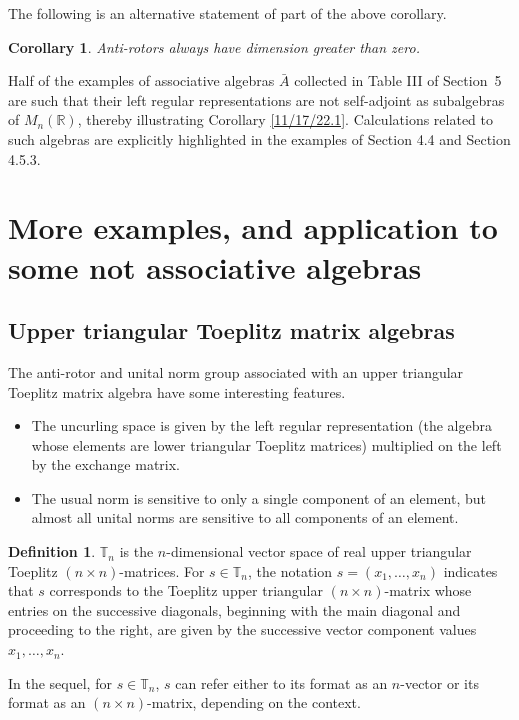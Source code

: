 \documentclass{amsart}
\numberwithin{equation}{section}
\newtheorem{corollary}[theorem]{Corollary}
\theoremstyle{definition}
\newtheorem{definition}[theorem]{Definition}
\numberwithin{theorem}{section}
\begin{document}
 The following is an alternative statement of part of the above corollary.   
 
 \begin{corollary}\label{1/1/23.1} Anti-rotors always have dimension greater than zero. \end{corollary}


Half of the examples of associative algebras $\bar{A}$ collected in Table III of \mbox{Section 5} are such that their left regular representations are not self-adjoint as subalgebras of $M_n(\mathbb{R})$, thereby illustrating Corollary \ref{11/17/22.1}.  Calculations related to such algebras are explicitly highlighted in the examples of Section 4.4 and Section 4.5.3.

\section{More examples, and application to some not associative algebras}
\subsection{Upper triangular Toeplitz matrix algebras}

The anti-rotor and unital norm group associated with an upper triangular Toeplitz matrix algebra have some interesting features.
\begin{itemize}\item The uncurling space is given by the left regular representation (the algebra whose elements are lower triangular Toeplitz matrices) multiplied on the left by the exchange matrix. \item The usual norm is sensitive to only a single component of an element, but almost all unital norms are sensitive to all components of an element.\end{itemize}


 \begin{definition}\label{5/4/22.1} $\mathbb{T}_n$ is the $n$-dimensional vector space of real upper triangular Toeplitz $(n\times n)$-matrices. For $s\in \mathbb{T}_n$, the notation $s=(x_1,\dots,x_n)$ indicates that $s$ corresponds to the Toeplitz upper triangular $(n\times n)$-matrix whose entries on the successive diagonals, beginning with the main diagonal and proceeding to the right, are given by the successive vector component values $x_1,\dots,x_n$.   
\end{definition}

In the sequel, for $s\in \mathbb{T}_n$, $s$ can refer either to its format as an $n$-vector or its format as an $(n\times n)$-matrix, depending on the context.
\end{document}
